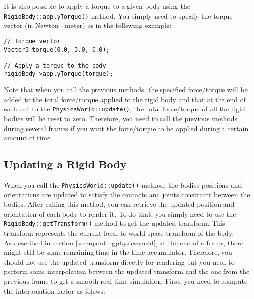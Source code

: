 \documentclass[a4paper,12pt]{article}
\begin{document}
    \vspace{0.6cm}

     \begin{sloppypar}
        It is also possible to apply a torque to a given body using the \texttt{RigidBody::applyTorque()} method. You simply need to specify
	the torque vector (in Newton $\cdot$ meter) as in the following example: \\
     \end{sloppypar}

    \begin{lstlisting}
// Torque vector
Vector3 torque(0.0, 3.0, 0.0);

// Apply a torque to the body
rigidBody->applyTorque(torque);
  \end{lstlisting}

    \vspace{0.6cm}

    Note that when you call the previous methods, the specified force/torque will be added to the total force/torque applied to the rigid body and that
    at the end of each call to the \texttt{PhysicsWorld::update()}, the total force/torque of all the rigid bodies will be reset to zero.
    Therefore, you need to call the previous methods during several frames if you want the force/torque to be applied during a certain amount of time.

    \subsection{Updating a Rigid Body}

    When you call the \texttt{PhysicsWorld::update()} method, the bodies positions and orientations are updated to satisfy the contacts and joints
    constraint between the bodies. After calling this method, you can retrieve the updated position and orientation of each body to render it.
    To do that, you simply need to use the \texttt{RigidBody::getTransform()} method to get the updated transform. This transform represents the
    current local-to-world-space transform of the body. \\

    As described in section \ref{sec:updatingphysicsworld}, at the end of a frame, there might still be some remaining time in the time accumulator.
    Therefore, you should not use the updated transform directly for rendering but you need to perform some interpolation between the updated transform
    and the one from the previous frame to get a smooth real-time simulation.  First, you need to compute the interpolation factor as folows: \\
\end{document}
